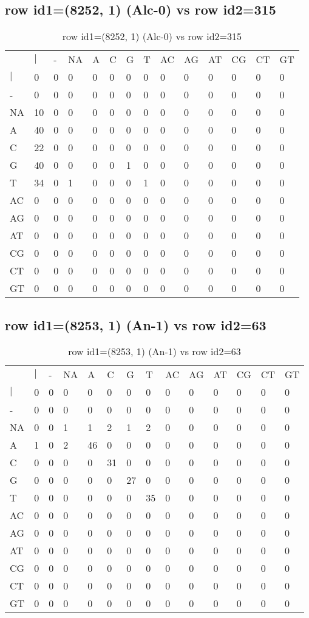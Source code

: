 \subsection{row id1=(8252, 1) (Alc-0) vs row id2=315}
\begin{center}
\begin{longtable}{|l|l|l|l|l|l|l|l|l|l|l|l|l|l|}
\caption{row id1=(8252, 1) (Alc-0) vs row id2=315} \label{table_dm388}\\
\hline
\\
\hline
&$|$&-&NA&A&C&G&T&AC&AG&AT&CG&CT&GT\\
$|$&0&0&0&0&0&0&0&0&0&0&0&0&0\\
-&0&0&0&0&0&0&0&0&0&0&0&0&0\\
NA&10&0&0&0&0&0&0&0&0&0&0&0&0\\
A&40&0&0&0&0&0&0&0&0&0&0&0&0\\
C&22&0&0&0&0&0&0&0&0&0&0&0&0\\
G&40&0&0&0&0&1&0&0&0&0&0&0&0\\
T&34&0&1&0&0&0&1&0&0&0&0&0&0\\
AC&0&0&0&0&0&0&0&0&0&0&0&0&0\\
AG&0&0&0&0&0&0&0&0&0&0&0&0&0\\
AT&0&0&0&0&0&0&0&0&0&0&0&0&0\\
CG&0&0&0&0&0&0&0&0&0&0&0&0&0\\
CT&0&0&0&0&0&0&0&0&0&0&0&0&0\\
GT&0&0&0&0&0&0&0&0&0&0&0&0&0\\
\hline
\end{longtable}
\end{center}

\subsection{row id1=(8253, 1) (An-1) vs row id2=63}
\begin{center}
\begin{longtable}{|l|l|l|l|l|l|l|l|l|l|l|l|l|l|}
\caption{row id1=(8253, 1) (An-1) vs row id2=63} \label{table_dm390}\\
\hline
\\
\hline
&$|$&-&NA&A&C&G&T&AC&AG&AT&CG&CT&GT\\
$|$&0&0&0&0&0&0&0&0&0&0&0&0&0\\
-&0&0&0&0&0&0&0&0&0&0&0&0&0\\
NA&0&0&1&1&2&1&2&0&0&0&0&0&0\\
A&1&0&2&46&0&0&0&0&0&0&0&0&0\\
C&0&0&0&0&31&0&0&0&0&0&0&0&0\\
G&0&0&0&0&0&27&0&0&0&0&0&0&0\\
T&0&0&0&0&0&0&35&0&0&0&0&0&0\\
AC&0&0&0&0&0&0&0&0&0&0&0&0&0\\
AG&0&0&0&0&0&0&0&0&0&0&0&0&0\\
AT&0&0&0&0&0&0&0&0&0&0&0&0&0\\
CG&0&0&0&0&0&0&0&0&0&0&0&0&0\\
CT&0&0&0&0&0&0&0&0&0&0&0&0&0\\
GT&0&0&0&0&0&0&0&0&0&0&0&0&0\\
\hline
\end{longtable}
\end{center}

